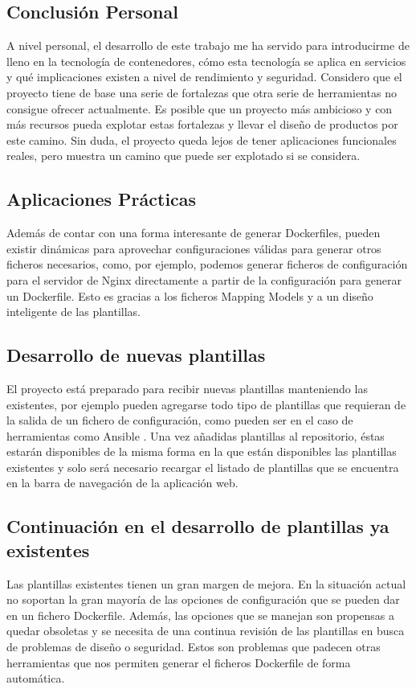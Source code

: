\documentclass[12pt, a4paper, twoside]{article}
\begin{document}
\subsection{Conclusión Personal}
A nivel personal, el desarrollo de este trabajo me ha servido para introducirme de lleno en la tecnología de contenedores, cómo esta tecnología se aplica en servicios y qué implicaciones existen a nivel de rendimiento y seguridad. Considero que el proyecto tiene de base una serie de fortalezas que otra serie de herramientas no consigue ofrecer actualmente. Es posible que un proyecto más ambicioso y con más recursos pueda explotar estas fortalezas y llevar el diseño de productos por este camino.
Sin duda, el proyecto queda lejos de tener aplicaciones funcionales reales, pero muestra un camino que puede ser explotado si se considera. 
\subsection{Aplicaciones Prácticas}
Además de contar con una forma interesante de generar Dockerfiles, pueden existir dinámicas para aprovechar configuraciones válidas para generar otros ficheros necesarios, como, por ejemplo, podemos generar ficheros de configuración para el servidor de Nginx \cite{nginx} directamente a partir de la configuración para generar un Dockerfile. 
Esto es gracias a los ficheros Mapping Models y a un diseño inteligente de las plantillas.
\subsection{Desarrollo de nuevas plantillas}
El proyecto está preparado para recibir nuevas plantillas manteniendo las existentes, por ejemplo pueden agregarse todo tipo de plantillas que requieran de la salida de un fichero de configuración, como pueden ser en el caso de herramientas como Ansible \cite{ansible}.	 
Una vez añadidas plantillas al repositorio, éstas estarán disponibles de la misma forma en la que están disponibles las plantillas existentes y solo será necesario recargar el listado de plantillas que se encuentra en la barra de navegación de la aplicación web.	
\subsection{Continuación en el desarrollo de plantillas ya existentes}
Las plantillas existentes tienen un gran margen de mejora. En la situación actual no soportan la gran mayoría de las opciones de configuración que se pueden dar en un fichero Dockerfile. Además, las opciones que se manejan son propensas a quedar obsoletas y se necesita de una continua revisión de las plantillas en busca de problemas de diseño o seguridad.
Estos son problemas que padecen otras herramientas que nos permiten generar el ficheros Dockerfile de forma automática.
\end{document}
